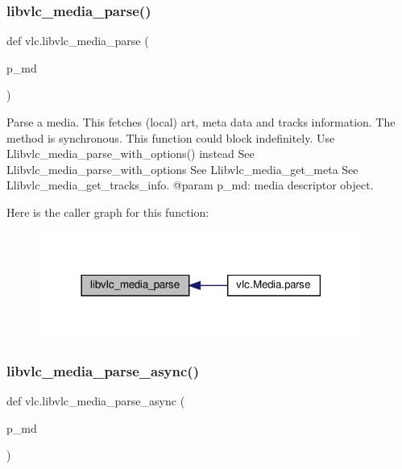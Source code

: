 \subsubsection{\texorpdfstring{libvlc\+\_\+media\+\_\+parse()}{libvlc\_media\_parse()}}
{\footnotesize\ttfamily def vlc.\+libvlc\+\_\+media\+\_\+parse (\begin{DoxyParamCaption}\item[{}]{p\+\_\+md }\end{DoxyParamCaption})}

\begin{DoxyVerb}Parse a media.
This fetches (local) art, meta data and tracks information.
The method is synchronous.
\deprecated This function could block indefinitely.
            Use L{libvlc_media_parse_with_options}() instead
See L{libvlc_media_parse_with_options}
See L{libvlc_media_get_meta}
See L{libvlc_media_get_tracks_info}.
@param p_md: media descriptor object.
\end{DoxyVerb}
 Here is the caller graph for this function\+:
\nopagebreak
\begin{figure}[H]
\begin{center}
\leavevmode
\includegraphics[width=302pt]{namespacevlc_ab3d4fc6015921771f0ec5292b51ec157_icgraph}
\end{center}
\end{figure}
\mbox{\label{namespacevlc_a37423ae6fdd1861b4823c167ec4662d1}} 
\subsubsection{\texorpdfstring{libvlc\+\_\+media\+\_\+parse\+\_\+async()}{libvlc\_media\_parse\_async()}}
{\footnotesize\ttfamily def vlc.\+libvlc\+\_\+media\+\_\+parse\+\_\+async (\begin{DoxyParamCaption}\item[{}]{p\+\_\+md }\end{DoxyParamCaption})}

